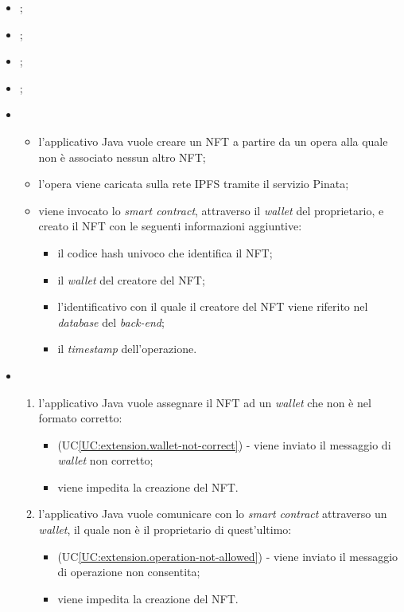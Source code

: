 \begin{itemize}
  \item {};
  \item {};
  \item {};
  \item {};
  \item \UCMain
  
  \begin{itemize}
    \item l'applicativo Java vuole creare un NFT a partire da un opera alla quale non è associato nessun altro NFT;
    \item l'opera viene caricata sulla rete IPFS tramite il servizio Pinata;
    \item viene invocato lo \textit{smart contract}, attraverso il \textit{wallet} del proprietario, e creato il NFT con le seguenti informazioni aggiuntive:
    \begin{itemize}
      \item il codice hash univoco che identifica il NFT;
      \item il \textit{wallet} del creatore del NFT;
      \item l'identificativo con il quale il creatore del NFT viene riferito nel \textit{database} del \textit{back-end};
      \item il \textit{timestamp} dell'operazione.
    \end{itemize}
  \end{itemize}
  
  \item \UCExt
  \begin{enumerate}[label=\lett]
    \item l'applicativo Java vuole assegnare il NFT ad un \textit{wallet} che non è nel formato corretto:
    \begin{itemize}
      \item (UC\ref{UC:extension.wallet-not-correct}) - viene inviato il messaggio di \textit{wallet} non corretto;
      \item viene impedita la creazione del NFT.
    \end{itemize}

    \item l'applicativo Java vuole comunicare con lo \textit{smart contract} attraverso un \textit{wallet}, il quale non è il proprietario di quest'ultimo:
    \begin{itemize}
      \item (UC\ref{UC:extension.operation-not-allowed}) - viene inviato il messaggio di operazione non consentita;
      \item viene impedita la creazione del NFT.
    \end{itemize}


\end{enumerate}
\end{itemize}
